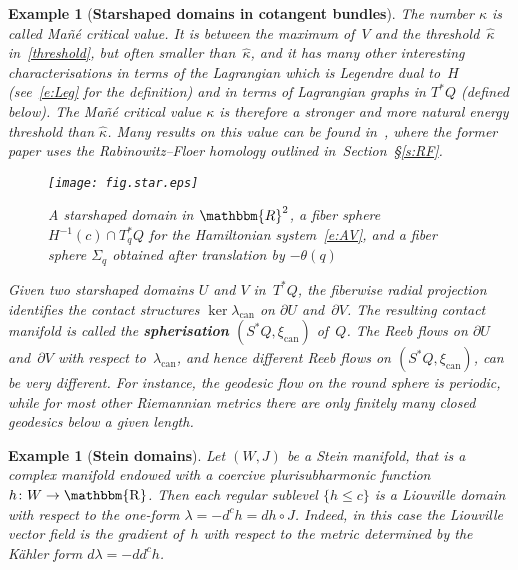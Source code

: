 \documentclass[12pt,twoside]{amsart}
\theoremstyle{plain}
\newtheorem{example}[theorem]{Example}
\numberwithin{figure}{section}
\numberwithin{equation}{section}
\def\can{\operatorname{can}}
\def\RR{\mathbbm{R}}
\def\R{\operatorname{\mathbbm{R}}}
\def\pp{\partial}
\begin{document}
\begin{example}[\bf Starshaped domains in cotangent bundles]
{The number $\kappa$ is called Ma\~n\'e critical value.
It is between the maximum of~$V$ and the threshold~$\hat \kappa$ in~\eqref{threshold},
but often smaller than~$\hat \kappa$, 
and it has many other interesting characterisations
in terms of the Lagrangian which is Legendre dual to~$H$ 
(see~\eqref{e:Leg} for the definition)
and in terms of Lagrangian graphs in $T^*Q$
(defined below).
The Ma\~n\'e critical value $\kappa$ is therefore a stronger and more natural energy threshold 
than $\hat \kappa$.
Many results on this value can be found in~\cite{CieFraPat10, CoItPa98}, 
where the former paper uses the Rabinowitz--Floer homology outlined in~Section~\S \ref{s:RF}.


%
\begin{figure}[h]   
 \begin{center} 
  \leavevmode\texttt{[image: fig.star.eps]}
 \end{center}
 \caption{A starshaped domain in $\RR^2$, 
a fiber sphere $H^{-1}(c) \cap T_q^*Q$ for the Hamiltonian system~\eqref{e:AV}, 
and a fiber sphere $\Sigma_q$ obtained after translation by $-\theta(q)$}
 \label{fig.star}
\end{figure}
%

Given two starshaped domains $U$ and $V$ in~$T^*Q$, the fiberwise radial projection 
identifies the contact structures $\ker \lambda_{\can}$ on $\pp U$ and~$\pp V$.
The resulting contact manifold is called the {\bf spherisation} $(S^*Q, \xi_{\can})$ of~$Q$. 
The Reeb flows on $\pp U$ and~$\pp V$ with respect to~$\lambda_{\can}$, 
and hence different Reeb flows on $(S^*Q, \xi_{\can})$,
can be very different. 
For instance, the geodesic flow on the round sphere is periodic, while 
for most other Riemannian metrics there are only finitely many closed geodesics below a given length.
}
\end{example}


\begin{example}[\bf Stein domains]
{\rm
Let $(W,J)$ be a Stein manifold, that is a complex ma\-ni\-fold endowed with a coercive plurisubharmonic function $h \colon W \rightarrow \R$. Then each regular sublevel $\{h \leqslant c\}$ is a Liouville domain with respect to the one-form $\lambda = - d^c h = dh\circ J$. Indeed, in this case the Liouville vector field is the gradient of~$h$ with respect to the metric determined by the K\"ahler form $d\lambda = -dd^c h$.
}
\end{example}
\end{document}

